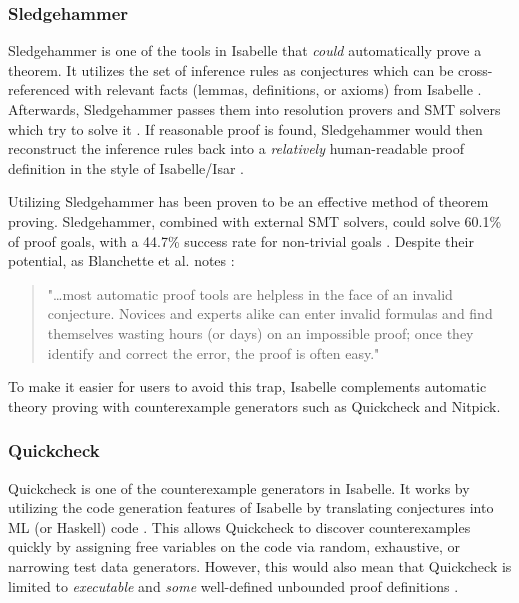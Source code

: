 \subsubsection{Sledgehammer}
\label{sec:Sledgehammer}

Sledgehammer is one of the tools in Isabelle that \emph{could} automatically prove a theorem. It utilizes the set of inference rules as 
conjectures which can be cross-referenced with relevant facts (lemmas, definitions, or axioms) from Isabelle \cite[Sec. 3]{isabelleProof}. 
Afterwards, Sledgehammer passes them into resolution provers and SMT solvers which try to solve it \cite[Sec. 3.3]{isabelleProof}. If reasonable 
proof is found, Sledgehammer would then reconstruct the inference rules back into a \emph{relatively} human-readable proof definition in the style of 
Isabelle/Isar \cite[Sec. 3.4]{isabelleProof}.

Utilizing Sledgehammer has been proven to be an effective method of theorem proving. Sledgehammer, combined with external SMT solvers, could 
solve 60.1\% of proof goals, with a 44.7\% success rate for non-trivial goals \cite[Sec. 6]{isabelleSledgehammerSMT}. Despite their 
potential, as Blanchette et al. notes \cite[pp. 2]{isabelleProof}:

\begin{quote}
    "\dots most automatic proof tools are helpless in the face of an invalid conjecture. Novices and experts alike can enter invalid formulas and 
    find themselves wasting hours (or days) on an impossible proof; once they identify and correct the error, the proof is often easy."
\end{quote}

To make it easier for users to avoid this trap, Isabelle complements automatic theory proving with counterexample generators such as Quickcheck 
and Nitpick.

\subsubsection{Quickcheck}
\label{sec:Quickcheck}

Quickcheck is one of the counterexample generators in Isabelle. It works by utilizing the code generation features of Isabelle by translating 
conjectures into ML (or Haskell) code \cite{isabelleQuickcheck}. This allows Quickcheck to discover counterexamples quickly by assigning 
free variables on the code via random, exhaustive, or narrowing test data generators. However, this would also mean that Quickcheck is limited 
to \emph{executable} and \emph{some} well-defined unbounded proof definitions \cite{isabelleQuickcheck}.

